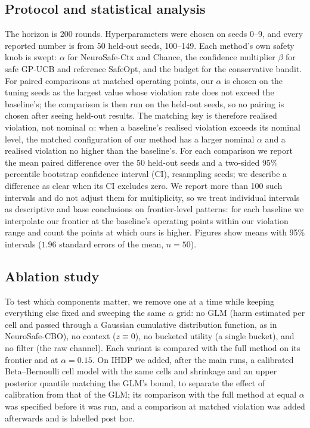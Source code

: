 \documentclass[10pt,a4paper]{article}
\begin{document}
\subsection*{Protocol and statistical analysis}
The horizon is 200 rounds. Hyperparameters were chosen on seeds 0--9, and every reported number is
from 50 held-out seeds, 100--149. Each method's own safety knob is swept: $\alpha$ for NeuroSafe-Ctx
and Chance, the confidence multiplier $\beta$ for safe GP-UCB and reference SafeOpt, and the budget for
the conservative bandit. For paired comparisons at matched operating points, our $\alpha$ is chosen on
the tuning seeds as the largest value whose violation rate does not exceed the baseline's; the
comparison is then run on the held-out seeds, so no pairing is chosen after seeing held-out results. The matching key is therefore realised violation, not nominal $\alpha$: when a baseline's realised violation exceeds its nominal level, the matched configuration of our method has a larger nominal $\alpha$ and a realised violation no higher than the baseline's.
For each comparison we report the mean paired difference over the 50 held-out seeds and a two-sided
95\% percentile bootstrap confidence interval (CI), resampling seeds; we describe a difference as
clear when its CI excludes zero. We report more than 100 such intervals and do not adjust them for
multiplicity, so we treat individual intervals as descriptive and base conclusions on frontier-level
patterns: for each baseline we interpolate our frontier at the baseline's operating points within our
violation range and count the points at which ours is higher. Figures show means with 95\% intervals
($1.96$ standard errors of the mean, $n=50$).

\subsection*{Ablation study}
To test which components matter, we remove one at a time while keeping everything else fixed and
sweeping the same $\alpha$ grid: no GLM (harm estimated per cell and passed through a Gaussian
cumulative distribution function, as in NeuroSafe-CBO), no context ($z\equiv0$), no bucketed
utility (a single bucket), and no filter (the raw channel). Each variant is compared with the full
method on its frontier and at $\alpha=0.15$. On IHDP we added, after the main runs, a calibrated
Beta--Bernoulli cell model with the same cells and shrinkage and an upper posterior quantile matching
the GLM's bound, to separate the effect of calibration from that of the GLM; its comparison with the
full method at equal $\alpha$ was specified before it was run, and a comparison at matched violation
was added afterwards and is labelled post hoc.
\end{document}
